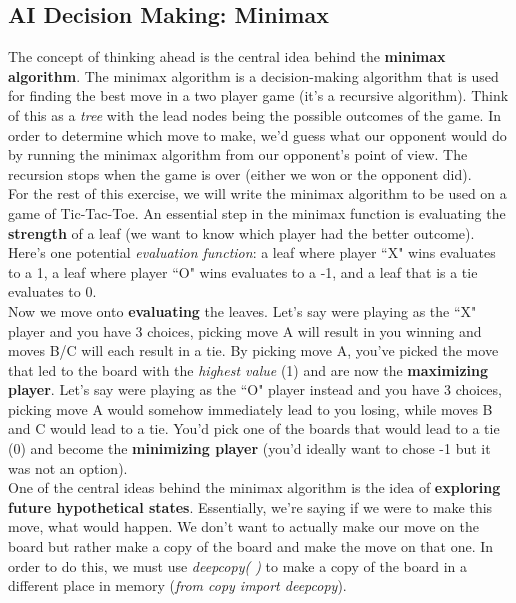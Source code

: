 \documentclass[11pt, a4paper]{article}
\begin{document}
\begin{spacing}{1.1}
	\subsection{AI Decision Making: Minimax}
	The concept of thinking ahead is the central idea behind the \textbf{minimax algorithm}. The minimax algorithm is a decision-making algorithm that is used for finding the best move in a two player game (it’s a recursive algorithm). Think of this as a \textit{tree} with the lead nodes being the possible outcomes of the game. In order to determine which move to make, we’d guess what our opponent would do by running the minimax algorithm from our opponent’s point of view. The recursion stops when the game is over (either we won or the opponent did). \vspace*{2mm} \\
	For the rest of this exercise, we will write the minimax algorithm to be used on a game of Tic-Tac-Toe. An essential step in the minimax function is evaluating the \textbf{strength} of a leaf (we want to know which player had the better outcome). Here’s one potential \textit{evaluation function}: a leaf where player ``X" wins evaluates to a 1, a leaf where player ``O" wins evaluates to a -1, and a leaf that is a tie evaluates to 0. \vspace*{2mm} \\
	Now we move onto \textbf{evaluating} the leaves. Let's say were playing as the ``X" player and you have 3 choices, picking move A will result in you winning and moves B/C will each result in a tie. By picking move A, you’ve picked the move that led to the board with the \textit{highest value} (1) and are now the \textbf{maximizing player}. Let's say were playing as the ``O" player instead and you have 3 choices, picking move A would somehow immediately lead to you losing, while moves B and C would lead to a tie. You’d pick one of the boards that would lead to a tie (0) and become the \textbf{minimizing player} (you'd ideally want to chose -1 but it was not an option). \vspace*{2mm} \\
	One of the central ideas behind the minimax algorithm is the idea of \textbf{exploring future hypothetical states}. Essentially, we’re saying if we were to make this move, what would happen. We don’t want to actually make our move on the board but rather make a copy of the board and make the move on that one. In order to do this, we must use \textit{deepcopy( )} to make a copy of the board in a different place in memory (\textit{from copy import deepcopy}).

\end{spacing}
\end{document}
